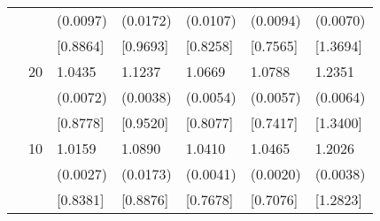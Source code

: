 \begin{table}[H]
{\begin{tabular}{c c | C{2.4cm} | C{2.4cm} | C{2.4cm} | C{2.4cm} | C{2.4cm} }
			&&(0.0097)&(0.0172)&(0.0107)&(0.0094)&(0.0070)\\
			&&[0.8864]&[0.9693]&[0.8258]&[0.7565]&[1.3694]\\
			&20&1.0435&1.1237&1.0669&1.0788&1.2351\\
			&&(0.0072)&(0.0038)&(0.0054)&(0.0057)&(0.0064)\\
			&&[0.8778]&[0.9520]&[0.8077]&[0.7417]&[1.3400]\\
			&10&1.0159&1.0890&1.0410&1.0465&1.2026\\
			&&(0.0027)&(0.0173)&(0.0041)&(0.0020)&(0.0038)\\
			&&[0.8381]&[0.8876]&[0.7678]&[0.7076]&[1.2823]\\
			\bottomrule[1.5pt]
	\end{tabular}}
	\label{table:table S.6}
\end{table}